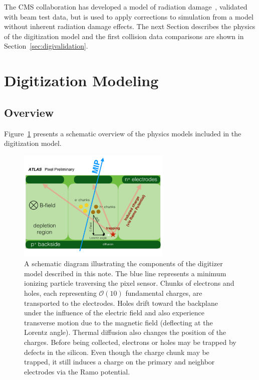   



The CMS collaboration has developed a model of radiation 
damage~\cite{Contardo:2020886,Swartz2002,Chiochia:2004qh,Swartz:2005vp}, validated with beam test data, but is used to apply corrections to simulation from a model without inherent radiation damage effects.  The next Section describes the physics of the digitization model and the first collision data comparisons are shown in Section~\ref{sec:digivalidation}.


\section{Digitization Modeling}
\label{sec:fullmodel}

\subsection{Overview}

Figure~\ref{fig:app:raddamge1} presents a schematic overview of the physics models included in the digitization model.   
\begin{figure}[htpb!]
\centering
\includegraphics[width=0.65\textwidth]{NewDigitizerSchematic.pdf}
\caption{A schematic diagram illustrating the components of the digitizer model described in this note.  The blue line represents a minimum ionizing particle traversing the pixel sensor.  Chunks of electrons and holes, each representing $\mathcal{O}(10)$ fundamental charges, are transported to the electrodes.  Holes drift toward the backplane under the influence of the electric field and also experience transverse motion due to the magnetic field (deflecting at the Lorentz angle).  Thermal diffusion also changes the position of the charges.  Before being collected, electrons or holes may be trapped by defects in the silicon.  Even though the charge chunk may be trapped, it still induces a charge on the primary and neighbor electrodes via the Ramo potential.}
\label{fig:app:raddamge1}
\end{figure}

